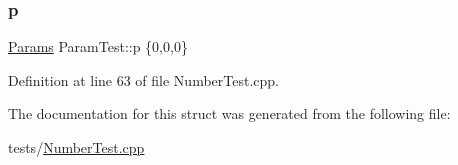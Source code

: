 \subsubsection{\texorpdfstring{p}{p}}
{\footnotesize\ttfamily \hyperlink{struct_params}{Params} Param\+Test\+::p \{0,0,0\}}



Definition at line 63 of file Number\+Test.\+cpp.



The documentation for this struct was generated from the following file\+:\begin{DoxyCompactItemize}
\item 
tests/\hyperlink{_number_test_8cpp}{Number\+Test.\+cpp}\end{DoxyCompactItemize}
